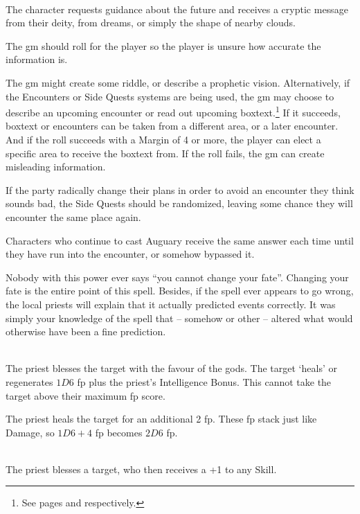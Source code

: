 \begin{multicols}{2}
\spelllevel

\\
The character requests guidance about the future and receives a cryptic message from their deity, from dreams, or simply the shape of nearby clouds.

The \gls{gm} should roll for the player so the player is unsure how accurate the information is.

The \gls{gm} might create some riddle, or describe a prophetic vision.
Alternatively, if the Encounters or Side Quests systems are being used, the \gls{gm} may choose to describe an upcoming encounter or read out upcoming boxtext.\footnote{See pages \pageref{encounters} and \pageref{sidequests} respectively.}
If it succeeds, boxtext or encounters can be taken from a different area, or a later encounter.
And if the roll succeeds with a Margin of 4 or more, the player can elect a specific area to receive the boxtext from.
If the roll fails, the \gls{gm} can create misleading information.

If the party radically change their plans in order to avoid an encounter they think sounds bad, the Side Quests should be randomized, leaving some chance they will encounter the same place again.

Characters who continue to cast Auguary receive the same answer each time until they have run into the encounter, or somehow bypassed it.

Nobody with this power ever says ``you cannot change your fate''.  Changing your fate is the entire point of this spell.  Besides, if the spell ever appears to go wrong, the local priests will explain that it actually predicted events correctly.  It was simply your knowledge of the spell that -- somehow or other -- altered what would otherwise have been a fine prediction.

\\
The priest blesses the target with the favour of the gods. The target `heals' or regenerates $1D6$ \gls{fp} plus the priest's Intelligence Bonus. This cannot take the target above their maximum \gls{fp} score.


The priest heals the target for an additional 2 \gls{fp}.  These \gls{fp} stack just like Damage, so $1D6+4$ \gls{fp} becomes $2D6$ \gls{fp}.

\spelllevel

\\
The priest blesses a target, who then receives a +1 to any Skill.


\end{multicols}
